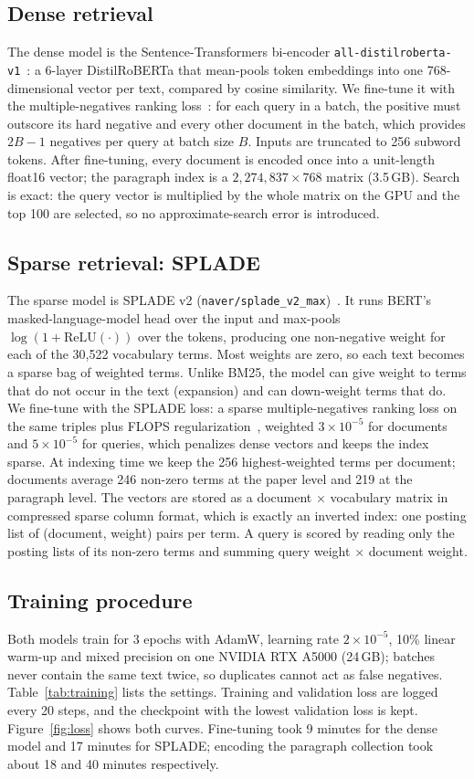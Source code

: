\documentclass[sigconf,nonacm]{acmart}
\begin{document}
\subsection{Dense retrieval}
The dense model is the Sentence-Transformers bi-encoder \texttt{all-}\allowbreak\texttt{distilroberta-v1}~\cite{sbert}: a 6-layer DistilRoBERTa that mean-pools token embeddings into one 768-dimensional vector per text, compared by cosine similarity. We fine-tune it with the multiple-negatives ranking loss~\cite{mnrl}: for each query in a batch, the positive must outscore its hard negative and every other document in the batch, which provides $2B-1$ negatives per query at batch size $B$. Inputs are truncated to 256 subword tokens. After fine-tuning, every document is encoded once into a unit-length float16 vector; the paragraph index is a $2{,}274{,}837\times768$ matrix (3.5\,GB). Search is exact: the query vector is multiplied by the whole matrix on the GPU and the top 100 are selected, so no approximate-search error is introduced.

\subsection{Sparse retrieval: SPLADE}
The sparse model is SPLADE v2 (\texttt{naver/splade\_v2\_max})~\cite{splade}. It runs BERT's masked-language-model head over the input and max-pools $\log(1+\mathrm{ReLU}(\cdot))$ over the tokens, producing one non-negative weight for each of the 30{,}522 vocabulary terms. Most weights are zero, so each text becomes a sparse bag of weighted terms. Unlike BM25, the model can give weight to terms that do not occur in the text (expansion) and can down-weight terms that do. We fine-tune with the SPLADE loss: a sparse multiple-negatives ranking loss on the same triples plus FLOPS regularization~\cite{flops}, weighted $3\times10^{-5}$ for documents and $5\times10^{-5}$ for queries, which penalizes dense vectors and keeps the index sparse. At indexing time we keep the 256 highest-weighted terms per document; documents average 246 non-zero terms at the paper level and 219 at the paragraph level. The vectors are stored as a document $\times$ vocabulary matrix in compressed sparse column format, which is exactly an inverted index: one posting list of (document, weight) pairs per term. A query is scored by reading only the posting lists of its non-zero terms and summing query weight $\times$ document weight.

\subsection{Training procedure}
Both models train for 3 epochs with AdamW, learning rate $2\times10^{-5}$, 10\% linear warm-up and mixed precision on one NVIDIA RTX A5000 (24\,GB); batches never contain the same text twice, so duplicates cannot act as false negatives. Table~\ref{tab:training} lists the settings. Training and validation loss are logged every 20 steps, and the checkpoint with the lowest validation loss is kept. Figure~\ref{fig:loss} shows both curves. Fine-tuning took 9 minutes for the dense model and 17 minutes for SPLADE; encoding the paragraph collection took about 18 and 40 minutes respectively.
\end{document}
